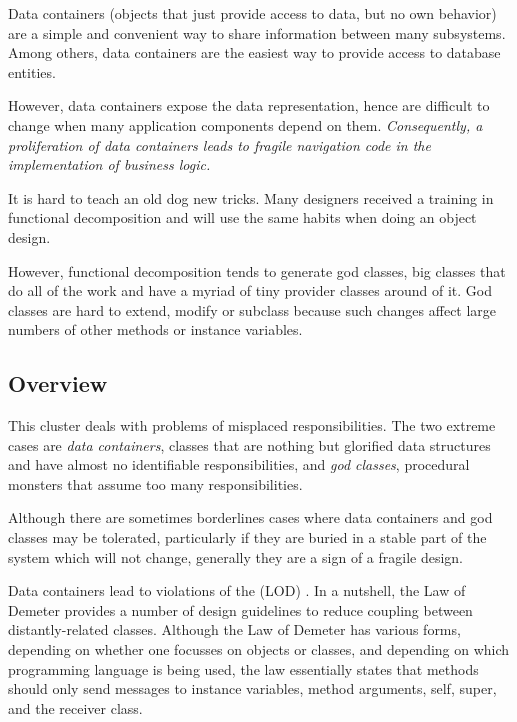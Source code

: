 \documentclass[a4paper,10pt,twoside]{book}
\begin{document}
\begin{bulletlist}
\item Data containers (objects that just provide access to data, but no own behavior) are a simple and convenient way to share information between many subsystems. Among others, data containers are the easiest way to provide access to database entities.

\item However, data containers expose the data representation, hence are difficult to change when many application components depend on them. \emph{Consequently, a proliferation of data containers leads to fragile navigation code in the implementation of business logic.}

\item It is hard to teach an old dog new tricks. Many designers received a training in functional decomposition and will use the same habits when doing an object design.

\item However, functional decomposition tends to generate god classes, \ie big classes that do all of the work and have a myriad of tiny provider classes around of it. God classes are hard to extend, modify or subclass because such changes affect large numbers of other methods or instance variables.
\end{bulletlist}

\subsection*{Overview}

This cluster deals with problems of misplaced responsibilities. The two extreme cases are \emph{data containers}, classes that are nothing but glorified data structures and have almost no identifiable responsibilities, and \emph{god classes}, procedural monsters that assume too many responsibilities.

Although there are sometimes borderlines cases where data containers and god classes may be tolerated, particularly if they are buried in a stable part of the system which will not change, generally they are a sign of a fragile design.

Data containers lead to violations of the  (LOD) \cite{Lieb88a}. In a nutshell, the Law of Demeter provides a number of design guidelines to reduce coupling between distantly-related classes. Although the Law of Demeter has various forms, depending on whether one focusses on objects or classes, and depending on which programming language is being used, the law essentially states that methods should only send messages to instance variables, method arguments, self, super, and the receiver class.
\end{document}

